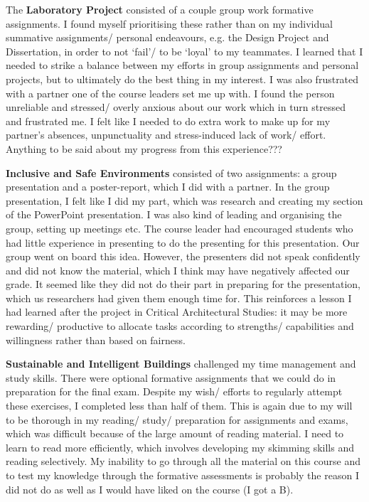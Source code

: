 The \textbf{Laboratory Project} consisted of a couple group work formative assignments.
I found myself prioritising these rather than on my individual summative assignments/ personal endeavours, e.g. the Design Project and Dissertation, in order to not `fail'/ to be `loyal' to my teammates.
I learned that I needed to strike a balance between my efforts in group assignments and personal projects, but to ultimately do the best thing in my interest.
I was also frustrated with a partner one of the course leaders set me up with.
I found the person unreliable and stressed/ overly anxious about our work which in turn stressed and frustrated me.
I felt like I needed to do extra work to make up for my partner's absences, unpunctuality and stress-induced lack of work/ effort.
Anything to be said about my progress from this experience???

\textbf{Inclusive and Safe Environments} consisted of two assignments: a group presentation and a poster-report, which I did with a partner.
In the group presentation, I felt like I did my part, which was research and creating my section of the PowerPoint presentation.
I was also kind of leading and organising the group, setting up meetings etc.
The course leader had encouraged students who had little experience in presenting to do the presenting for this presentation.
Our group went on board this idea.
However, the presenters did not speak confidently and did not know the material, which I think may have negatively affected our grade.
It seemed like they did not do their part in preparing for the presentation, which us researchers had given them enough time for.
This reinforces a lesson I had learned after the project in Critical Architectural Studies: it may be more rewarding/ productive to allocate tasks according to strengths/ capabilities and willingness rather than based on fairness.

\textbf{Sustainable and Intelligent Buildings} challenged my time management and study skills.
There were optional formative assignments that we could do in preparation for the final exam.
Despite my wish/ efforts to regularly attempt these exercises, I completed less than half of them.
This is again due to my will to be thorough in my reading/ study/ preparation for assignments and exams, which was difficult because of the large amount of reading material.
I need to learn to read more efficiently, which involves developing my skimming skills and reading selectively.
My inability to go through all the material on this course and to test my knowledge through the formative assessments is probably the reason I did not do as well as I would have liked on the course (I got a B).

